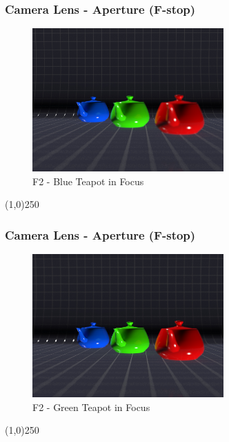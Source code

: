 \begin{frame}
\frametitle{Camera Lens - Aperture (F-stop)}
\begin{figure}
	\centering
	\includegraphics[height=5.5cm]{img/Cameras/BlueTeapot.jpg}
	\caption[F2 - Blue Teapot in Focus]{F2 - Blue Teapot in Focus}
	\label{fig:F2-BlueTeaPot}
\end{figure}
\end{frame}
\begin{center}\line(1,0){250}\end{center}



\begin{frame}
\frametitle{Camera Lens - Aperture (F-stop)}
\begin{figure}
	\centering
	\includegraphics[height=5.5cm]{img/Cameras/GreenTeapot.jpg}
	\caption[F2 - Green Teapot in Focus]{F2 - Green Teapot in Focus}
	\label{fig:GreenTeaPot}
\end{figure}
\end{frame}
\begin{center}\line(1,0){250}\end{center}


